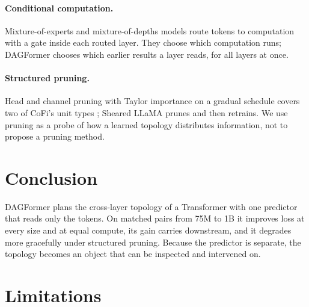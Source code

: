 \documentclass[11pt]{article}
\newcommand{\dagf}{DAGFormer}
\begin{document}
\paragraph{Conditional computation.} Mixture-of-experts and mixture-of-depths models \citep{shazeer2017moe,fedus2022switch,raposo2024mod} route tokens to computation with a gate inside each routed layer. They choose which computation runs; \dagf{} chooses which earlier results a layer reads, for all layers at once.

\paragraph{Structured pruning.} Head and channel pruning with Taylor importance on a gradual schedule \citep{michel2019heads,molchanov2019taylor,zhu2017prune} covers two of CoFi's unit types \citep{xia2022cofi}; Sheared LLaMA \citep{xia2023sheared} prunes and then retrains. We use pruning as a probe of how a learned topology distributes information, not to propose a pruning method.

\section{Conclusion}

\dagf{} plans the cross-layer topology of a Transformer with one predictor that reads only the tokens. On matched pairs from 75M to 1B it improves loss at every size and at equal compute, its gain carries downstream, and it degrades more gracefully under structured pruning. Because the predictor is separate, the topology becomes an object that can be inspected and intervened on.

\section*{Limitations}
\label{sec:limitations}
\end{document}
